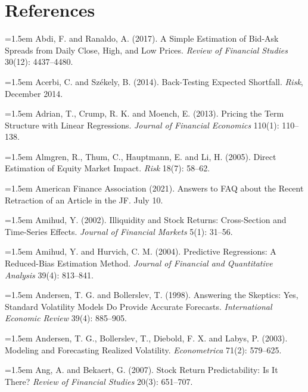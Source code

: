 \chapter*{References}
\label{references}

\begingroup
\small
\sloppy
\setlength{\parindent}{0pt}
\setlength{\parskip}{3pt}

\hangindent=1.5em Abdi, F. and Ranaldo, A. (2017). A Simple Estimation of Bid-Ask Spreads from Daily Close, High, and Low Prices. \emph{Review of Financial Studies} 30(12): 4437--4480.

\hangindent=1.5em Acerbi, C. and Sz\'ekely, B. (2014). Back-Testing Expected Shortfall. \emph{Risk}, December 2014.

\hangindent=1.5em Adrian, T., Crump, R. K. and Moench, E. (2013). Pricing the Term Structure with Linear Regressions. \emph{Journal of Financial Economics} 110(1): 110--138.

\hangindent=1.5em Almgren, R., Thum, C., Hauptmann, E. and Li, H. (2005). Direct Estimation of Equity Market Impact. \emph{Risk} 18(7): 58--62.

\hangindent=1.5em American Finance Association (2021). Answers to FAQ about the Recent Retraction of an Article in the JF. July 10.

\hangindent=1.5em Amihud, Y. (2002). Illiquidity and Stock Returns: Cross-Section and Time-Series Effects. \emph{Journal of Financial Markets} 5(1): 31--56.

\hangindent=1.5em Amihud, Y. and Hurvich, C. M. (2004). Predictive Regressions: A Reduced-Bias Estimation Method. \emph{Journal of Financial and Quantitative Analysis} 39(4): 813--841.

\hangindent=1.5em Andersen, T. G. and Bollerslev, T. (1998). Answering the Skeptics: Yes, Standard Volatility Models Do Provide Accurate Forecasts. \emph{International Economic Review} 39(4): 885--905.

\hangindent=1.5em Andersen, T. G., Bollerslev, T., Diebold, F. X. and Labys, P. (2003). Modeling and Forecasting Realized Volatility. \emph{Econometrica} 71(2): 579--625.

\hangindent=1.5em Ang, A. and Bekaert, G. (2007). Stock Return Predictability: Is It There? \emph{Review of Financial Studies} 20(3): 651--707.

